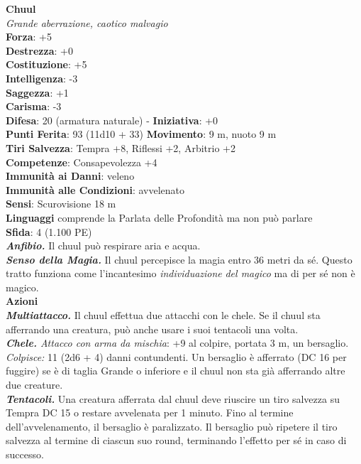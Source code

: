 \begin{multicols}{2}
\medskip\textbf{Chuul}\\
\emph{Grande aberrazione, caotico malvagio}\\
\textbf{Forza}: +5\\
\textbf{Destrezza}: +0\\
\textbf{Costituzione}: +5\\
\textbf{Intelligenza}: -3\\
\textbf{Saggezza}: +1\\
\textbf{Carisma}: -3\\
\textbf{Difesa}: 20 (armatura naturale) - \textbf{Iniziativa}: +0\\
\textbf{Punti Ferita}: 93 (11d10 + 33)
\textbf{Movimento}: 9 m, nuoto 9 m\\
\textbf{Tiri Salvezza}: Tempra +8, Riflessi +2, Arbitrio +2\\
\textbf{Competenze}: Consapevolezza +4\\
\textbf{Immunità ai Danni}: veleno\\
\textbf{Immunità alle Condizioni}: avvelenato\\
\textbf{Sensi}: Scurovisione 18 m\\
\textbf{Linguaggi} comprende la Parlata delle Profondità ma non può parlare\\
\textbf{Sfida}: 4 (1.100 PE)\smallskip\\
\emph{\textbf{Anfibio.}} Il chuul può respirare aria e acqua.\\
\emph{\textbf{Senso della Magia.}} Il chuul percepisce la magia entro 36 metri da sé. Questo tratto funziona come l'incantesimo \emph{individuazione} \emph{del magico} ma di per sé non è magico.\\
\smallskip\textbf{Azioni}\\
\emph{\textbf{Multiattacco.}} Il chuul effettua due attacchi con le chele. Se il chuul sta afferrando una creatura, può anche usare i suoi tentacoli una volta.\\
\emph{\textbf{Chele.} Attacco con arma da mischia}: +9 al colpire, portata 3 m, un bersaglio.\\
\emph{Colpisce:} 11 (2d6 + 4) danni contundenti. Un bersaglio è afferrato (DC  16 per fuggire) se è di taglia Grande o inferiore e il chuul non sta già afferrando altre due creature.\\
\emph{\textbf{Tentacoli.}} Una creatura afferrata dal chuul deve riuscire un tiro salvezza su Tempra DC  15 o restare avvelenata per 1 minuto. Fino al termine dell'avvelenamento, il bersaglio è paralizzato. Il bersaglio può ripetere il tiro salvezza al termine di ciascun suo round, terminando l'effetto per sé in caso di successo.\\

\end{multicols}
